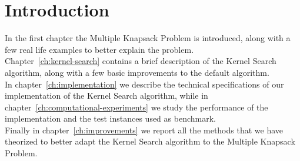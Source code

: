 \chapter{Introduction}
In the first chapter the Multiple Knapsack Problem is introduced,
along with a few real life examples to better explain the problem.\\
Chapter~\ref{ch:kernel-search} contains a brief description of the Kernel Search algorithm,
along with a few basic improvements to the default algorithm.\\
In chapter~\ref{ch:implementation} we describe the technical
specifications of our implementation of the Kernel Search algorithm,
while in chapter~\ref{ch:computational-experiments} we study
the performance of the implementation and the test instances used as benchmark.\\
Finally in chapter~\ref{ch:improvements} we report all
the methods that we have theorized to better adapt the Kernel Search
algorithm to the Multiple Knapsack Problem.


